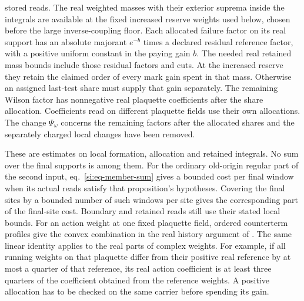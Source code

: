 \documentclass[11pt,letterpaper,reqno]{amsart}
\numberwithin{equation}{section}
\renewcommand{\eqref}[1]{\textup{eq.~\ref{#1}}}
\theoremstyle{definition}
\theoremstyle{remark}
\begin{document}
\begin{enumerate}
  stored reads. The real weighted masses with their exterior
  suprema inside the integrals are available at the fixed
  increased reserve weights used below, chosen before
  the large inverse-coupling floor. Each allocated failure factor
  on its real support has an absolute majorant $e^{-b}$ times a
  declared residual reference factor, with a positive uniform
  constant in the paying gain $b$. The needed real retained mass
  bounds include those residual factors and cuts. At the increased
  reserve they retain the claimed order of every mark gain spent
  in that mass. Otherwise an assigned last-test share must supply
  that gain separately. The remaining
  Wilson factor has nonnegative real plaquette coefficients after
  the share allocation. Coefficients read on different plaquette
  fields use their own allocations. The change $\Psi_\omega$
  concerns the remaining factors after the allocated shares and
  the separately charged local changes have been removed.
\end{enumerate}

These are estimates on local formation, allocation and retained
integrals. No sum over the final supports is among them.
For the ordinary old-origin regular part of the second input,
\eqref{si:eq-member-sum} gives a bounded cost per final window
when its actual reads satisfy that proposition's hypotheses.
Covering the final sites by a bounded number of such windows per
site gives the corresponding part of the final-site cost.
Boundary and retained reads still use their stated local bounds.
For an
action weight at one fixed plaquette field, ordered counterterm
profiles give the convex combination in the real history argument
of \cite[Equation~(2.vi)]{RT}. The same linear identity applies to the real parts
of complex weights. For example, if all running weights on that
plaquette differ from their positive real reference by at most a
quarter of that reference, its real action coefficient is at least
three quarters of the coefficient obtained from the reference
weights. A positive allocation has to be checked on the same
carrier before spending its gain.
\end{document}
